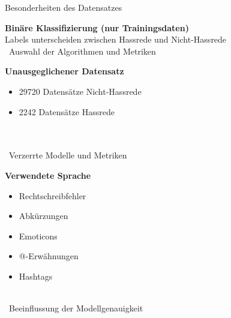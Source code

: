 \documentclass[aspectratio=169]{beamer} %
\begin{document}
\begin{frame}{Besonderheiten des Datensatzes}
    \begin{minipage}[t][0.9\textheight][t]{0.28\textwidth}
        \vspace{0.6cm} %
        \textbf{Binäre Klassifizierung (nur Trainingsdaten)}
        \vspace{0.75cm} %
        \\
        Labels unterscheiden zwischen Hassrede und Nicht-Hassrede
        \\
        [1.45cm]
        \textrightarrow\ Auswahl der Algorithmen und Metriken 
    \end{minipage}
    \hspace{0.5cm}
    \begin{minipage}[t][0.9\textheight][t]{0.28\textwidth}
        \vspace{0.6cm} %
        \textbf{Unausgeglichener Datensatz}
        \vspace{0.35cm} %
        \begin{itemize}[label=\textbullet]
            \item 29720 Datensätze Nicht-Hassrede
            \item 2242 Datensätze Hassrede 
        \end{itemize}
        \\[1cm]
        \vspace{1cm}
        \\
        \textrightarrow\ Verzerrte Modelle und Metriken
    \end{minipage}
    \hspace{0.5cm}
    \begin{minipage}[t][0.9\textheight][t]{0.28\textwidth}
        \vspace{0.6cm} %
        \textbf{Verwendete Sprache}
        \vspace{0.35cm} %
        \vspace{0.35cm} %
        \begin{itemize}[label=\textbullet]
            \item Rechtschreibfehler
            \item Abkürzungen
            \item Emoticons
            \item @-Erwähnungen
            \item Hashtags
        \end{itemize}
        \\
        \vspace{0.3cm}
        \textrightarrow\ Beeinflussung der Modellgenauigkeit
        \\\Rightarrow\ 
    \end{minipage}
\end{frame}
\end{document}
